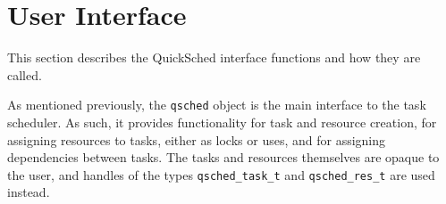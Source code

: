 \documentclass[fleqn,10pt]{wlpeerj}
\begin{document}
% 



\appendix
\section{User Interface}

This section describes the QuickSched interface functions and how they
are called.

As mentioned previously, the {\tt qsched} object is the main
interface to the task scheduler.
As such, it provides functionality for task and resource
creation, for assigning resources to tasks, either as locks
or uses, and for assigning dependencies between tasks.
The tasks and resources themselves are opaque to the
user, and handles of the types {\tt qsched\_task\_t}
and {\tt qsched\_res\_t} are used instead.
\end{document}
